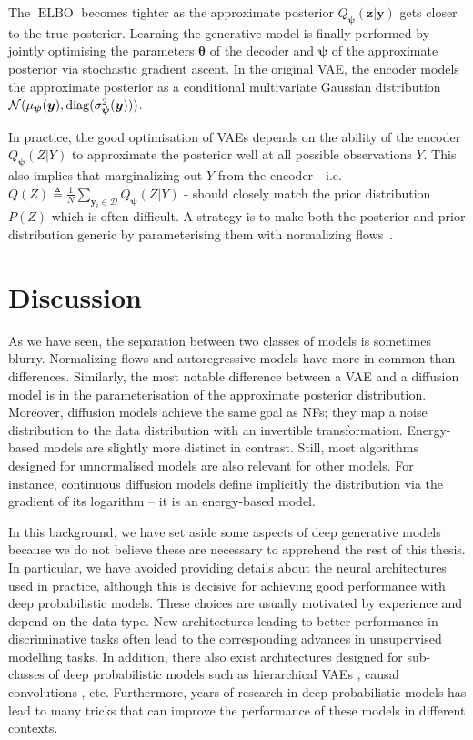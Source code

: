 The $\operatorname{ELBO}$ becomes tighter as the approximate posterior $Q_{\bm \psi}(\mathbf{z}|\mathbf{y})$ gets closer to the true posterior.
Learning the generative model is finally performed by jointly optimising the parameters $\mathbf{\theta}$ of the decoder and ${\bm \psi}$ of the approximate posterior via stochastic gradient ascent.
In the original VAE, the encoder models the approximate posterior as a conditional multivariate Gaussian distribution $\mathcal{N}(\mu_{\bm \psi}(\mathbf{y}), \diag(\sigma_{\bm\psi}^2(\mathbf{y})))$.

In practice, the good optimisation of VAEs depends on the ability of the encoder $Q_{\bm \psi}(Z|Y)$ to approximate the posterior well at all possible observations $Y$. This also implies that marginalizing out $Y$ from the encoder - i.e. $Q(Z) \triangleq \frac{1}{N}\sum_{\bm{y}_i \in \mathcal{D}} Q_{\bm \psi}(Z|Y)$ - should closely match the prior distribution $P(Z)$ which is often difficult. A strategy is to make both the posterior and prior distribution generic by parameterising them with normalizing flows~\citep{berg2018sylvester}.

\section{Discussion}
As we have seen, the separation between two classes of models is sometimes blurry. Normalizing flows and autoregressive models have more in common than differences. Similarly, the most notable difference between a VAE and a diffusion model is in the parameterisation of the approximate posterior distribution. Moreover, diffusion models achieve the same goal as NFs; they map a noise distribution to the data distribution with an invertible transformation. Energy-based models are slightly more distinct in contrast. Still, most algorithms designed for unnormalised models are also relevant for other models. For instance, continuous diffusion models define implicitly the distribution via the gradient of its logarithm -- it is an energy-based model.

In this background, we have set aside some aspects of deep generative models because we do not believe these are necessary to apprehend the rest of this thesis. In particular, we have avoided providing details about the neural architectures used in practice, although this is decisive for achieving good performance with deep probabilistic models. These choices are usually motivated by experience and depend on the data type. New architectures leading to better performance in discriminative tasks often lead to the corresponding advances in unsupervised modelling tasks. In addition, there also exist architectures designed for sub-classes of deep probabilistic models such as hierarchical VAEs \citep{vahdat_nvae_2020}, causal convolutions \citep{van_den_oord_wavenet_2016}, etc. Furthermore, years of research in deep probabilistic models has lead to many tricks that can improve the performance of these models in different contexts.

